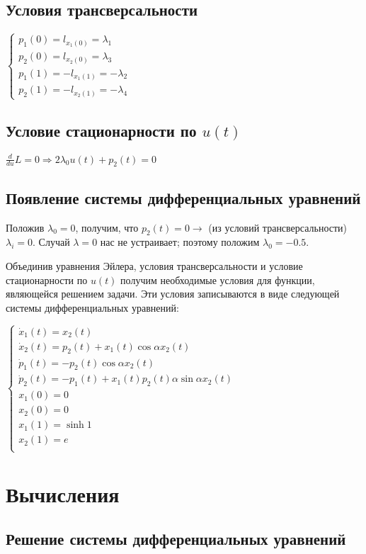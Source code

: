 \documentclass[24pt]{article}
\begin{document}
\subsection{Условия трансверсальности}
$
\begin{cases}
p_1(0) = l_{x_1(0)} = \lambda_1\\
p_2(0) = l_{x_2(0)} = \lambda_3\\
p_1(1) = -l_{x_1(1)} = -\lambda_2\\
p_2(1) = -l_{x_2(1)} = -\lambda_4
\end{cases}
$
\subsection{Условие стационарности по $u(t)$}
$
\frac{d}{du}L = 0 \Rightarrow 2\lambda_0u(t) + p_2(t) = 0
$
\subsection{Появление системы дифференциальных уравнений}
Положив $\lambda_0 = 0$, получим, что $p_2(t) = 0 \rightarrow$ (из условий трансверсальности) $\lambda_i = 0$. Случай $\lambda = 0$ нас не устраивает; поэтому положим $\lambda_0 = -0.5$.

Объединив уравнения Эйлера, условия трансверсальности и условие стационарности по $u(t)$ получим необходимые условия для функции, являющейся решением задачи. Эти условия записываются в виде следующей системы дифференциальных уравнений:

$
\begin{cases}
\dot x_1(t) = x_2(t)\\
\dot x_2(t) = p_2(t) +x_1(t)\cos\alpha x_2 (t)\\
\dot p_1(t) = -p_2(t)\cos\alpha x_2(t)\\
\dot p_2(t) = -p_1(t) + x_1(t)p_2(t)\alpha\sin\alpha x_2(t)\\
x_1(0) = 0\\
x_2(0) = 0\\
x_1(1) = \sinh 1\\
x_2(1) = e\\
\end{cases}
$
\section{Вычисления}
\subsection{Решение системы дифференциальных уравнений}
\end{document}
